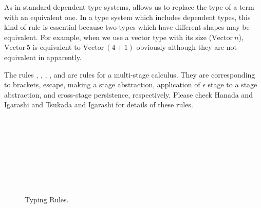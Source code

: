 {}
As in standard dependent type systems, \TConv{} allows us to replace
the type of a term with an equivalent one.  
In a type system which includes dependent types, this kind of rule is essential
because two types which have different shapes may be equivalent.
For example, when we use a vector type with its size ($\textrm{Vector}\ n$),
$\textrm{Vector}\ 5$ is equivalent to $\textrm{Vector}\ (4+1)$ obviously although they are not equivalent in apparently.


The rules \TTB, \TTBL, \TGen, \TIns, and \TCsp{} are rules for a multi-stage calculus.
They are corresponding to brackets, escape, making a stage abstraction, 
application of $\epsilon$ stage to a stage abstraction, and cross-stage persistence, respectively.
Please check Hanada and Igarashi \cite{Hanada2014} and Tsukada and Igarashi \cite{Tsukada} for details of these rules.

\begin{figure}
	\begin{center}
		 \\[2mm]
		 \\[2mm]
		 \\[2mm]
		 \\[2mm]
		 \\[2mm]
		 \andalso
		 \\[2mm]
		 \\[2mm]
		 \andalso
		\caption{Typing Rules.}
		\label{fig:typing-rules}
	\end{center}
\end{figure}

